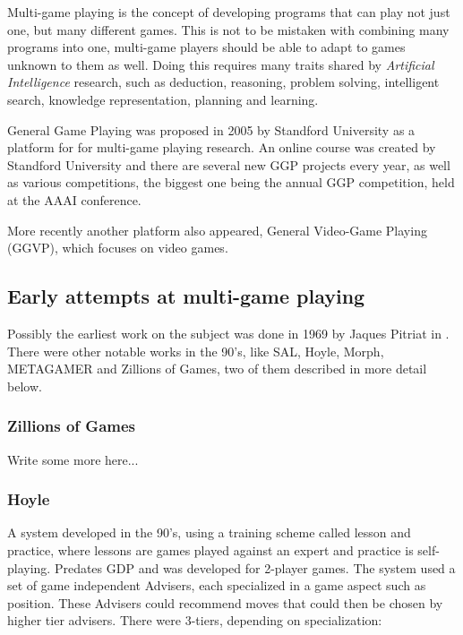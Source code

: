 Multi-game playing is the concept of developing programs that can play not just one, but many different games. This is not to be mistaken with combining many programs into one, multi-game players should be able to adapt to games unknown to them as well. Doing this requires many traits shared by \textit{Artificial Intelligence} research, such as deduction, reasoning, problem solving, intelligent search, knowledge representation, planning and learning.

General Game Playing was proposed in 2005 by Standford University as a platform for for multi-game playing research. An online course was created by Standford University and there are several new GGP projects every year, as well as various competitions, the biggest one being the annual GGP competition, held at the AAAI conference.

More recently another platform also appeared, General Video-Game Playing (GGVP), which focuses on video games.

\subsection{Early attempts at multi-game playing}

Possibly the earliest work on the subject was done in 1969 by Jaques Pitriat in \cite{Pitrat1969}. There were other notable works in the 90's, like SAL, Hoyle, Morph, METAGAMER and Zillions of Games, two of them described in more detail below.

\subsubsection{Zillions of Games}

Write some more here...

\subsubsection{Hoyle}
A system developed in the 90’s, using a training scheme called lesson and practice, where lessons are games played against an expert and practice is self-playing. Predates GDP and was developed for 2-player games. The system used a set of game independent Advisers, each specialized in a game aspect such as position. These Advisers could recommend moves that could then be chosen by higher tier advisers. There were 3-tiers, depending on specialization:


